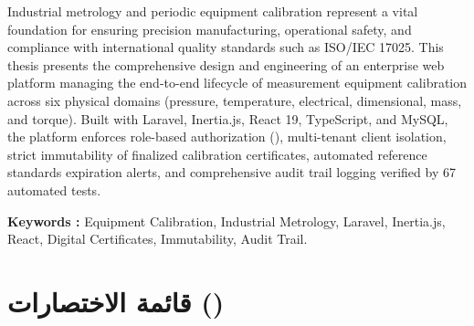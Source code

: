 \documentclass{bts-report-ar}
\begin{document}
\begin{abstracten}
Industrial metrology and periodic equipment calibration represent a vital foundation for ensuring precision manufacturing, operational safety, and compliance with international quality standards such as ISO/IEC 17025. This thesis presents the comprehensive design and engineering of an enterprise web platform managing the end-to-end lifecycle of measurement equipment calibration across six physical domains (pressure, temperature, electrical, dimensional, mass, and torque). Built with Laravel, Inertia.js, React 19, TypeScript, and MySQL, the platform enforces role-based authorization (), multi-tenant client isolation, strict immutability of finalized calibration certificates, automated reference standards expiration alerts, and comprehensive audit trail logging verified by 67 automated tests.

\vspace{0.6cm}
\noindent\textbf{Keywords :} Equipment Calibration, Industrial Metrology, Laravel, Inertia.js, React, Digital Certificates, Immutability, Audit Trail.
\end{abstracten}

\tableofcontents
\listoffigures
\listoftables

\chapter*{قائمة الاختصارات ()}
\end{document}
